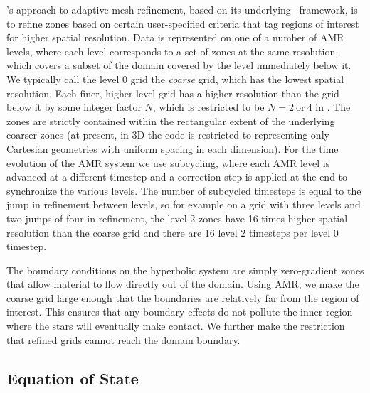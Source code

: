 \documentclass[12pt]{article}
\begin{document}
\castro's approach to adaptive mesh refinement, based on its underlying
\boxlib\ framework, is to refine zones based on certain user-specified
criteria that tag regions of interest for higher spatial
resolution. Data is represented on one of a number of AMR levels,
where each level corresponds to a set of zones at the same resolution,
which covers a subset of the domain covered by the level immediately
below it. We typically call the level 0 grid the \textit{coarse} grid,
which has the lowest spatial resolution. Each finer, higher-level grid
has a higher resolution than the grid below it by some integer factor
$N$, which is restricted to be $N = 2\ \text{or}\ 4$ in \castro. The
zones are strictly contained within the rectangular extent of the
underlying coarser zones (at present, in 3D the code is restricted to representing
only Cartesian geometries with uniform spacing in each dimension). For the time
evolution of the AMR system we use subcycling, where each AMR level is
advanced at a different timestep and a correction step is applied at
the end to synchronize the various levels. The number of
subcycled timesteps is equal to the jump in refinement between levels,
so for example on a grid with three levels and two jumps of four in
refinement, the level 2 zones have 16 times higher spatial
resolution than the coarse grid and there are 16 level 2 timesteps
per level 0 timestep.

The boundary conditions on the hyperbolic system are simply
zero-gradient zones that allow material to flow directly out of the
domain. Using AMR, we make the coarse grid large enough that the
boundaries are relatively far from the region of interest. This
ensures that any boundary effects do not pollute the inner region
where the stars will eventually make contact.  We further make the
restriction that refined grids cannot reach the domain boundary.


\subsection{Equation of State}
\label{sec:eos}
\end{document}
